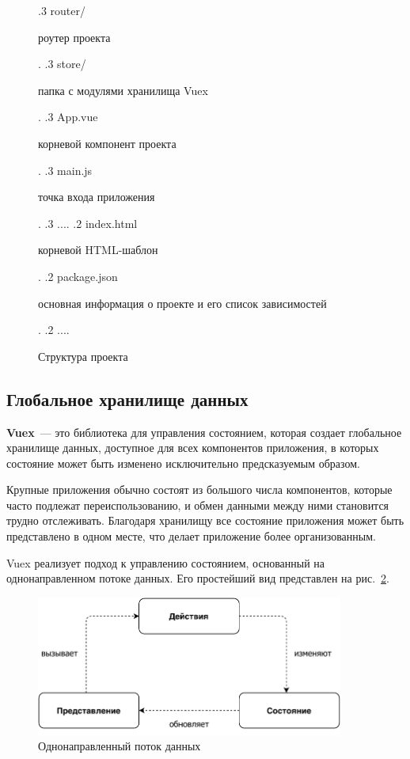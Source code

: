 \begin{figure}
{		.3 router/
		\dotfill
		\begin{minipage}[t]{8cm}
			роутер проекта
		\end{minipage}.
		.3 store/
		\dotfill
		\begin{minipage}[t]{8cm}
			папка с модулями хранилища Vuex
		\end{minipage}.
		.3 App.vue
		\dotfill
		\begin{minipage}[t]{8cm}
			корневой компонент проекта
		\end{minipage}.
		.3 main.js
		\dotfill
		\begin{minipage}[t]{8cm}
			точка входа приложения
		\end{minipage}.
		.3 ....
		.2 index.html
		\dotfill
		\begin{minipage}[t]{8cm}
			корневой HTML-шаблон
		\end{minipage}.
		.2 package.json
		\dotfill
		\begin{minipage}[t]{8cm}
			основная информация о проекте и его список зависимостей
		\end{minipage}.
		.2 ....
	} 
	\caption{Структура проекта}
	\label{list:struct}
\end{figure}

\subsection{Глобальное хранилище данных}

\textbf{Vuex}~--- это библиотека для управления состоянием, которая создает глобальное хранилище данных, доступное для всех компонентов приложения, в которых состояние может быть изменено исключительно предсказуемым образом.

Крупные приложения обычно состоят из большого числа компонентов, которые часто подлежат переиспользованию, и обмен данными между ними становится трудно отслеживать. Благодаря хранилищу все состояние приложения может быть представлено в одном месте, что делает приложение более организованным.

Vuex реализует подход к управлению состоянием, основанный на однонаправленном потоке данных. Его простейший вид представлен на рис.~\ref{fig:vuex}.

\begin{figure}
	\centering
	\includegraphics[width=0.9\textwidth, keepaspectratio]{figures/vuex}
	\caption{Однонаправленный поток данных}
	\label{fig:vuex}
\end{figure}

